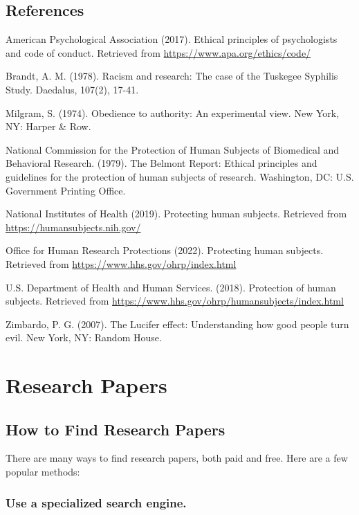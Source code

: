 \documentclass[
  b5paper]{book}
\begin{document}
\hypertarget{references}{%
\section{References}\label{references}}

American Psychological Association (2017). Ethical principles of psychologists and code of conduct. Retrieved from \url{https://www.apa.org/ethics/code/}

Brandt, A. M. (1978). Racism and research: The case of the Tuskegee Syphilis Study. Daedalus, 107(2), 17-41.

Milgram, S. (1974). Obedience to authority: An experimental view. New York, NY: Harper \& Row.

National Commission for the Protection of Human Subjects of Biomedical and Behavioral Research. (1979). The Belmont Report: Ethical principles and guidelines for the protection of human subjects of research. Washington, DC: U.S. Government Printing Office.

National Institutes of Health (2019). Protecting human subjects. Retrieved from \url{https://humansubjects.nih.gov/}

Office for Human Research Protections (2022). Protecting human subjects. Retrieved from \url{https://www.hhs.gov/ohrp/index.html}

U.S. Department of Health and Human Services. (2018). Protection of human subjects. Retrieved from \url{https://www.hhs.gov/ohrp/humansubjects/index.html}

Zimbardo, P. G. (2007). The Lucifer effect: Understanding how good people turn evil. New York, NY: Random House.

\hypertarget{research-papers-1}{%
\chapter{Research Papers}\label{research-papers-1}}

\hypertarget{find}{%
\section{How to Find Research Papers}\label{find}}

There are many ways to find research papers, both paid and free. Here are a few popular methods:

\hypertarget{use-a-specialized-search-engine.}{%
\subsection*{Use a specialized search engine.}\label{use-a-specialized-search-engine.}}
\end{document}
